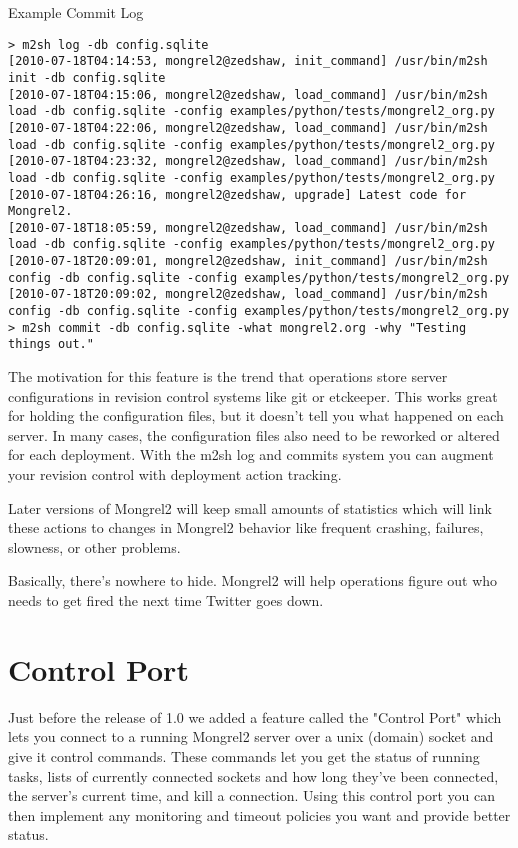 \begin{code}{Example Commit Log}
\begin{lstlisting}
> m2sh log -db config.sqlite 
[2010-07-18T04:14:53, mongrel2@zedshaw, init_command] /usr/bin/m2sh init -db config.sqlite
[2010-07-18T04:15:06, mongrel2@zedshaw, load_command] /usr/bin/m2sh load -db config.sqlite -config examples/python/tests/mongrel2_org.py
[2010-07-18T04:22:06, mongrel2@zedshaw, load_command] /usr/bin/m2sh load -db config.sqlite -config examples/python/tests/mongrel2_org.py
[2010-07-18T04:23:32, mongrel2@zedshaw, load_command] /usr/bin/m2sh load -db config.sqlite -config examples/python/tests/mongrel2_org.py
[2010-07-18T04:26:16, mongrel2@zedshaw, upgrade] Latest code for Mongrel2.
[2010-07-18T18:05:59, mongrel2@zedshaw, load_command] /usr/bin/m2sh load -db config.sqlite -config examples/python/tests/mongrel2_org.py
[2010-07-18T20:09:01, mongrel2@zedshaw, init_command] /usr/bin/m2sh config -db config.sqlite -config examples/python/tests/mongrel2_org.py
[2010-07-18T20:09:02, mongrel2@zedshaw, load_command] /usr/bin/m2sh config -db config.sqlite -config examples/python/tests/mongrel2_org.py
> m2sh commit -db config.sqlite -what mongrel2.org -why "Testing things out."
\end{lstlisting}
\end{code}

The motivation for this feature is the trend that operations store server configurations
in revision control systems like git or etckeeper.  This works great for holding the configuration
files, but it doesn't tell you what happened on each server.  In many cases, the configuration
files also need to be reworked or altered for each deployment.  With the m2sh log and commits
system you can augment your revision control with deployment action tracking.

Later versions of Mongrel2 will keep small amounts of statistics which will link these actions
to changes in Mongrel2 behavior like frequent crashing, failures, slowness, or other problems.

Basically, there's nowhere to hide.  Mongrel2 will help operations figure out who needs to
get fired the next time Twitter goes down.


\section{Control Port}

Just before the release of 1.0 we added a feature called the "Control Port" which
lets you connect to a running Mongrel2 server over a unix (domain) socket and
give it control commands.  These commands let you get the status of running
tasks, lists of currently connected sockets and how long they've been connected,
the server's current time, and kill a connection.  Using this control port you
can then implement any monitoring and timeout policies you want and provide 
better status.

